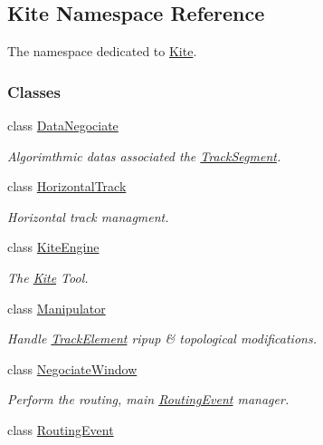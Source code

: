 \hypertarget{namespaceKite}{}\subsection{Kite Namespace Reference}
\label{namespaceKite}


The namespace dedicated to \mbox{\hyperlink{namespaceKite}{Kite}}.  


\subsubsection*{Classes}
\begin{DoxyCompactItemize}
\item 
class \mbox{\hyperlink{classKite_1_1DataNegociate}{Data\+Negociate}}
\begin{DoxyCompactList}\small\item\em Algorimthmic datas associated the \mbox{\hyperlink{classKite_1_1TrackSegment}{Track\+Segment}}. \end{DoxyCompactList}\item 
class \mbox{\hyperlink{classKite_1_1HorizontalTrack}{Horizontal\+Track}}
\begin{DoxyCompactList}\small\item\em Horizontal track managment. \end{DoxyCompactList}\item 
class \mbox{\hyperlink{classKite_1_1KiteEngine}{Kite\+Engine}}
\begin{DoxyCompactList}\small\item\em The \mbox{\hyperlink{namespaceKite}{Kite}} Tool. \end{DoxyCompactList}\item 
class \mbox{\hyperlink{classKite_1_1Manipulator}{Manipulator}}
\begin{DoxyCompactList}\small\item\em Handle \mbox{\hyperlink{classKite_1_1TrackElement}{Track\+Element}} ripup \& topological modifications. \end{DoxyCompactList}\item 
class \mbox{\hyperlink{classKite_1_1NegociateWindow}{Negociate\+Window}}
\begin{DoxyCompactList}\small\item\em Perform the routing, main \mbox{\hyperlink{classKite_1_1RoutingEvent}{Routing\+Event}} manager. \end{DoxyCompactList}\item 
class \mbox{\hyperlink{classKite_1_1RoutingEvent}{Routing\+Event}}

\end{DoxyCompactItemize}
